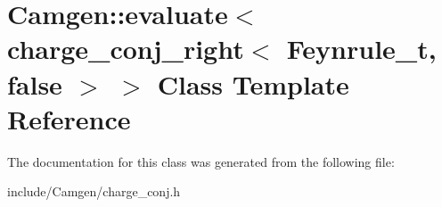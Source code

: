 \hypertarget{a00150}{}\section{Camgen\+:\+:evaluate$<$ charge\+\_\+conj\+\_\+right$<$ Feynrule\+\_\+t, false $>$ $>$ Class Template Reference}
\label{a00150}


The documentation for this class was generated from the following file\+:\begin{DoxyCompactItemize}
\item 
include/\+Camgen/charge\+\_\+conj.\+h\end{DoxyCompactItemize}
